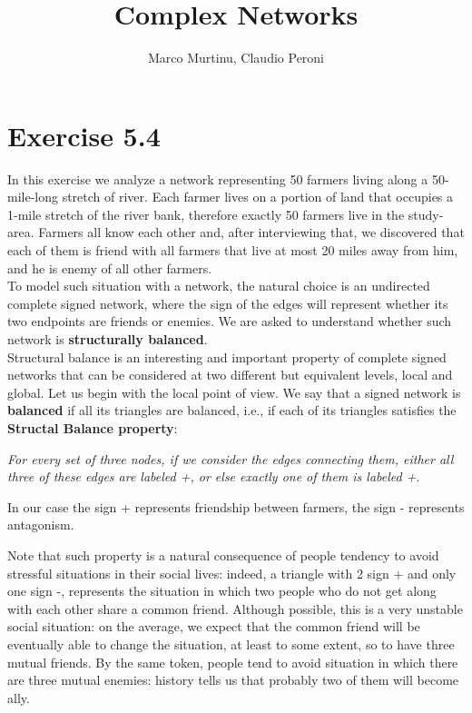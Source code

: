 \documentclass{report}
\title{Complex Networks}
\author{{Marco Murtinu, Claudio Peroni}}
\theoremstyle{definition}
\theoremstyle{remark}
\begin{document}
	\maketitle

\section*{Exercise 5.4}

In this exercise we analyze a network representing 50 farmers living along a 50-mile-long stretch of river. Each farmer lives on a portion of land that occupies a 1-mile stretch of the river bank, therefore exactly 50 farmers live in the study-area. Farmers all know each other and, after interviewing that, we discovered that each of them is friend with all farmers that live at most 20 miles away from him, and he is enemy of all other farmers.\\
To model such situation with a network, the natural choice is an undirected complete signed network, where the sign of the edges will represent whether its two endpoints are friends or enemies. We are asked to understand whether such network is \textbf{structurally balanced}.\\
Structural balance is an interesting and important property of complete signed networks that can be considered at two different but equivalent levels, local and global. Let us begin with the local point of view. We say that a signed network is \textbf{balanced} if all its triangles are balanced, i.e., if each of its triangles satisfies the \textbf{Structal Balance property}:
\bigskip

\textit{For every set of three nodes, if we consider the edges connecting them, either all three of these edges are labeled +, or else exactly one of them is labeled +}.
\bigskip


In our case the sign + represents friendship between farmers, the sign - represents antagonism.

Note that such property is a natural consequence of people tendency to avoid stressful situations in their social lives: indeed, a triangle with 2 sign + and only one sign -, represents the situation in which two people who do not get along with each other share a common friend. Although possible, this is a very unstable social situation: on the average, we expect that the common friend will be eventually able to change the situation, at least to some extent, so to have three mutual friends. By the same token, people tend to avoid situation in which there are three mutual enemies: history tells us that probably two of them will become ally.
\end{document}
